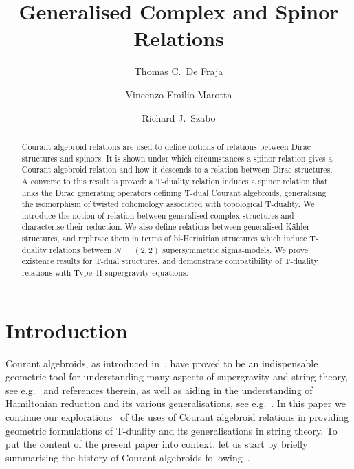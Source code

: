 \documentclass[a4paper, reqno, 11pt]{amsart}
\title{Generalised Complex and Spinor Relations}
\author[T.~C.~De Fraja]{Thomas C.~De Fraja}
\author[V.~E.~ Marotta]{Vincenzo Emilio Marotta}
\author[R.~J. Szabo]{Richard J.~Szabo}
\date{}
\numberwithin{equation}{section}
\theoremstyle{definition}
\newcommand{\cN}{{\mathcal N}}
\theoremstyle{remark}
\begin{document}
\begin{abstract}
    Courant algebroid relations are used to define notions of relations between Dirac structures and spinors. It is shown under which circumstances a spinor relation gives a Courant algebroid relation and how it descends to a relation between Dirac structures. A converse to this result is proved: a T-duality relation induces a spinor relation that links the Dirac generating operators defining  T-dual Courant algebroids, generalising the isomorphism of twisted cohomology associated with topological T-duality. We  introduce the notion of relation between generalised complex structures and  characterise their reduction. We also define relations between generalised K{\"a}hler structures, and rephrase them in terms of bi-Hermitian structures which induce T-duality relations between  $\cN=(2,2)$ supersymmetric sigma-models. We prove existence results for T-dual structures, and demonstrate  compatibility of T-duality relations with Type~II supergravity equations.
\end{abstract}

\maketitle

{\baselineskip=12pt
\tableofcontents
}

\section{Introduction}
Courant algebroids, as introduced in~\cite{Courant1990, Weinstein1997, Severa-letters, Hitchin:2003cxu}, have  proved to be an indispensable geometric tool for understanding many aspects of supergravity and string theory, see e.g.~\cite{Coimbra:2011nw,Jurco2016courant} and references therein, as well as aiding in the understanding of Hamiltonian reduction and its various generalisations, see e.g.~\cite{courant1988beyond,bursztyn2007dirac, LiBland2009,vsevera2001poisson}. In this paper we continue our explorations~\cite{DeFraja:2023fhe,deFraja2025Ricci} of the uses of Courant algebroid relations in providing geometric formulations of T-duality and its  generalisations in string theory. To put the content of the present paper into context, let us start by briefly summarising the history of Courant algebroids following~\cite{kosmann2013courant}.

\medskip
\end{document}
